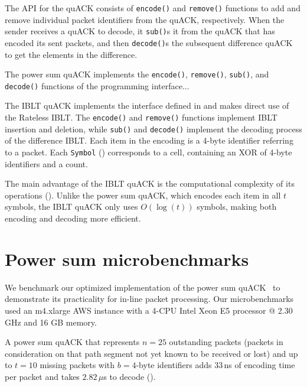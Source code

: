 

The API for the quACK consists of \texttt{encode()} and \texttt{remove()}
functions to add and remove individual packet identifiers from the quACK,
respectively. When the sender receives a quACK to decode, it \texttt{sub()}s
it from the quACK that has encoded its sent packets, and then \texttt{decode()}s
the subsequent difference quACK to get the elements in the difference.

The power sum quACK implements the \texttt{encode()}, \texttt{remove()},
\texttt{sub()}, and \texttt{decode()} functions of the programming interface...

The IBLT quACK implements
the interface defined in  and makes direct use of the Rateless IBLT.
The \texttt{encode()} and \texttt{remove()} functions implement IBLT insertion
and deletion, while \texttt{sub()} and \texttt{decode()} implement
the decoding process of the difference IBLT.
Each item in the encoding is a 4-byte identifier referring to a packet.
Each \texttt{Symbol} () corresponds to a
cell, containing an XOR of 4-byte identifiers and a count.

The main advantage of the IBLT quACK is the computational complexity of its
operations (). Unlike the power sum quACK,
which encodes each item in all $t$ symbols, the IBLT quACK only uses
$O(\log(t))$ symbols, making both encoding and decoding more efficient.

\section{Power sum microbenchmarks}
\label{sec:quack:psum-microbenchmarks}



We benchmark our optimized implementation of the power sum quACK~\cite{quack-github}
to demonstrate its practicality for in-line packet processing.
Our microbenchmarks used an m4.xlarge AWS instance with a 4-CPU Intel Xeon E5
processor @ 2.30 GHz and 16 GB memory.



A power sum quACK that represents $n=25$ outstanding packets
(packets in consideration on that path segment not yet known to be received or lost)
and up to $t=10$ missing
packets with $b=4$-byte identifiers adds $33$\,ns of encoding time per
packet and takes $2.82$\,$\mu$s to decode ().

